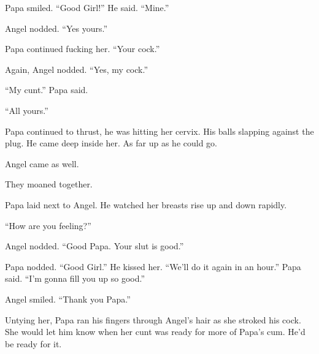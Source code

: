      Papa smiled. “Good Girl!” He said. “Mine.”

     Angel nodded. “Yes yours.”

     Papa continued fucking her. “Your cock.”

     Again, Angel nodded. “Yes, my cock.”

     “My cunt.” Papa said.

     “All yours.”

     Papa continued to thrust, he was hitting her cervix. His balls slapping against the plug. He came deep inside her. As far up as he could go.

     Angel came as well.

     They moaned together.

     Papa laid next to Angel. He watched her breasts rise up and down rapidly.

     “How are you feeling?”

     Angel nodded. “Good Papa. Your slut is good.”

     Papa nodded. “Good Girl.” He kissed her. “We’ll do it again in an hour.” Papa said. “I’m gonna fill you up so good.”

     Angel smiled. “Thank you Papa.”

     Untying her, Papa ran his fingers through Angel’s hair as she stroked his cock. She would let him know when her cunt was ready for more of Papa’s cum. He’d be ready for it.


